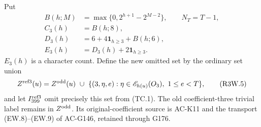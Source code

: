 Put
\[
 \begin{aligned}
 B(h;M)&=\max\{0,2^{h+1}-2^{M-2}\},\qquad N_T=T-1,\\
 C_3(h)&=B(h;8),\\
 D_3(h)&=6+4\mathbf1_{h\geq3}+B(h;6),\\
 E_3(h)&=D_3(h)+2\mathbf1_{h\geq3}.
 \end{aligned}\tag{R3W.4}
\]
$E_3(h)$ is a character count.
Define the new omitted set by the ordinary set union
\[
 Z^{\rm ref3}(u)=Z^{\rm odd}(u)\ \cup\
       \{(3,\eta,e):\eta\in\mathscr E_{h(u)}(O_3),\ 1\leq e<T\},
 \tag{R3W.5}
\]
and let $I_{399}^{\rm ref3}$ omit precisely this set from (TC.1).
The old coefficient-three trivial label remains in $Z^{\rm odd}$.
Its original-coefficient source is AC-K11 and the transport
(EW.8)--(EW.9) of AC-G146, retained through G176.

